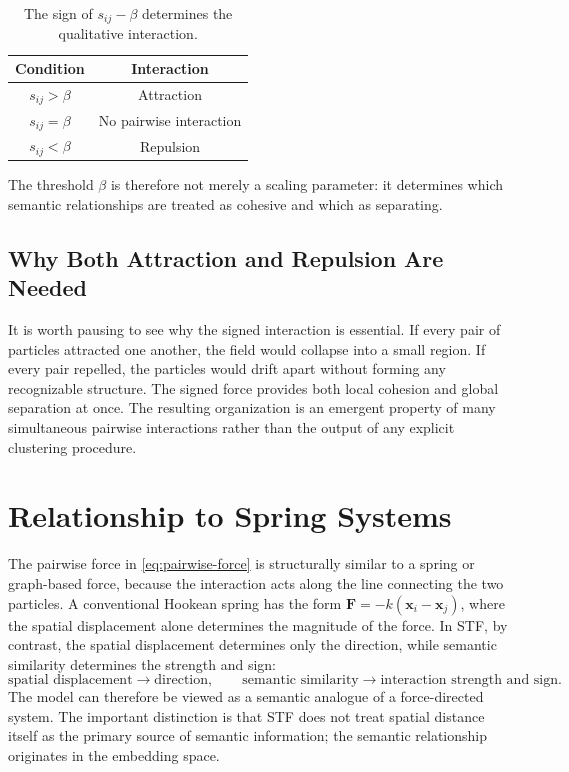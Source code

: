 \documentclass[11pt]{amsart}
\begin{document}
\begin{table}[h]
\centering
\begin{tabular}{c|c}
\textbf{Condition} & \textbf{Interaction} \\
\hline
$s_{ij} > \beta$ & Attraction \\
$s_{ij} = \beta$ & No pairwise interaction \\
$s_{ij} < \beta$ & Repulsion \\
\end{tabular}
\caption{The sign of $s_{ij} - \beta$ determines the qualitative interaction.}
\label{tab:interaction}
\end{table}

The threshold $\beta$ is therefore not merely a scaling parameter: it
determines which semantic relationships are treated as cohesive and which as
separating.

\subsection{Why Both Attraction and Repulsion Are Needed}

It is worth pausing to see why the signed interaction is essential. If every
pair of particles attracted one another, the field would collapse into a small
region. If every pair repelled, the particles would drift apart without forming
any recognizable structure. The signed force provides both local cohesion and
global separation at once. The resulting organization is an emergent property
of many simultaneous pairwise interactions rather than the output of any
explicit clustering procedure.

\section{Relationship to Spring Systems}

The pairwise force in \eqref{eq:pairwise-force} is structurally similar to a
spring or graph-based force, because the interaction acts along the line
connecting the two particles. A conventional Hookean spring has the form
$\mathbf{F} = -k(\mathbf{x}_i - \mathbf{x}_j)$, where the spatial displacement
alone determines the magnitude of the force. In STF, by contrast, the spatial
displacement determines only the direction, while semantic similarity
determines the strength and sign:
\[
\text{spatial displacement} \rightarrow \text{direction},
\qquad
\text{semantic similarity} \rightarrow \text{interaction strength and sign}.
\]
The model can therefore be viewed as a semantic analogue of a force-directed
system. The important distinction is that STF does not treat spatial distance
itself as the primary source of semantic information; the semantic relationship
originates in the embedding space.
\end{document}
